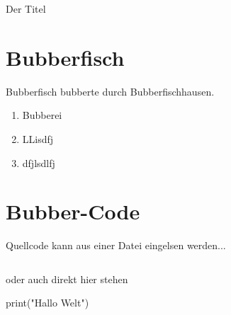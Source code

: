\documentclass{\VorlagenPfad/coderdojokatext}
\renewcommand{\Titel}{Der Titel}
\begin{document}
\begin{center}
	{\huge \Titel}
\end{center}

\section{Bubberfisch}
Bubberfisch bubberte durch Bubberfischhausen.


\begin{enumerate}
	\item Bubberei
	\item LLisdfj 
	\item dfjlsdlfj 
\end{enumerate}

\section{Bubber-Code}
Quellcode kann aus einer Datei eingelsen werden...
\inputminted[firstline=5, lastline=8,linenos, breaklines, frame=single, framesep=10pt,framerule=1pt]{python}{../Python/Beispiele/zahlen_raten.py}

oder auch direkt hier stehen

\begin{pythoncode}
print("Hallo Welt")
\end{pythoncode}
\end{document}
